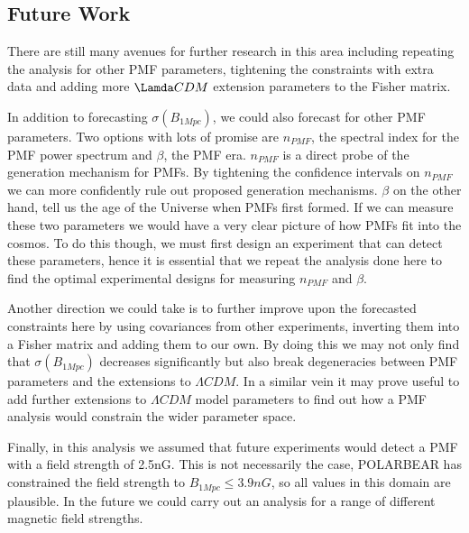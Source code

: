 \pagebreak

\subsection{Future Work}

There are still many avenues for further research in this area including repeating the analysis for other PMF parameters, tightening the constraints with extra data and adding more $\Lamda CDM$ extension parameters to the Fisher matrix.

In addition to forecasting $\sigma(B_{1Mpc})$, we could also forecast for other PMF parameters. Two options with lots of promise are $n_{PMF}$, the spectral index for the PMF power spectrum and $\beta$, the PMF era. $n_{PMF}$ is a direct probe of the generation mechanism for PMFs. By tightening the confidence intervals on $n_{PMF}$ we can more confidently rule out proposed generation mechanisms. $\beta$ on the other hand, tell us the age of the Universe when PMFs first formed. If we can measure these two parameters we would have a very clear picture of how PMFs fit into the cosmos. To do this though, we must first design an experiment that can detect these parameters, hence it is essential that we repeat the analysis done here to find the optimal experimental designs for measuring $n_{PMF}$ and $\beta$.

Another direction we could take is to further improve upon the forecasted constraints here by using covariances from other experiments, inverting them into a Fisher matrix and adding them to our own. By doing this we may not only find that $\sigma(B_{1Mpc})$ decreases significantly but also break degeneracies between PMF parameters and the extensions to $\Lambda CDM$. In a similar vein it may prove useful to add further extensions to $\Lambda CDM$ model parameters to find out how a PMF analysis would constrain the wider parameter space.

Finally, in this analysis we assumed that future experiments would detect a PMF with a field strength of 2.5nG. This is not necessarily the case, POLARBEAR has constrained the field strength to $B_{1Mpc} \leq 3.9nG$, so all values in this domain are plausible. In the future we could carry out an analysis for a range of different magnetic field strengths.



